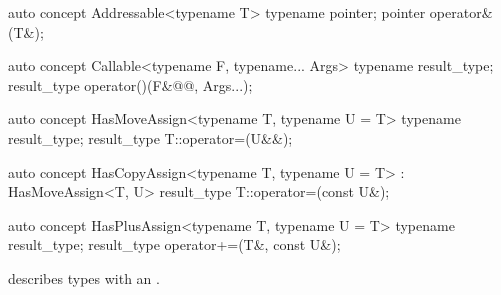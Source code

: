 \documentclass[american,twoside]{book}
\begin{document}
\begin{itemdecl}
auto concept Addressable<typename T> {
  typename pointer;
  pointer operator&(T&);
}
\end{itemdecl}

\begin{itemdescr}
\pnum
{}
\end{itemdescr}

\begin{itemdecl}
auto concept Callable<typename F, typename... Args> {
  typename result_type;
  result_type operator()(F&@\addedZ{\&}@, Args...);
}
\end{itemdecl}

\begin{itemdescr}
\pnum 
{}
\end{itemdescr}

\begin{itemdecl}
auto concept HasMoveAssign<typename T, typename U = T> {
  typename result_type;
  result_type T::operator=(U&&);
}
\end{itemdecl}

\begin{itemdescr}
\pnum
{}
\end{itemdescr}

\begin{itemdecl}
auto concept HasCopyAssign<typename T, typename U = T> : HasMoveAssign<T, U> {
  result_type T::operator=(const U&);
}
\end{itemdecl}

\begin{itemdescr}
\pnum
{}
\end{itemdescr}

\begin{itemdecl}
auto concept HasPlusAssign<typename T, typename U = T> {
  typename result_type;
  result_type operator+=(T&, const U&);
}
\end{itemdecl}

\begin{itemdescr}
\pnum
\mbox{\reallynote} describes types with an \mbox{}.
\end{itemdescr}
\end{document}
